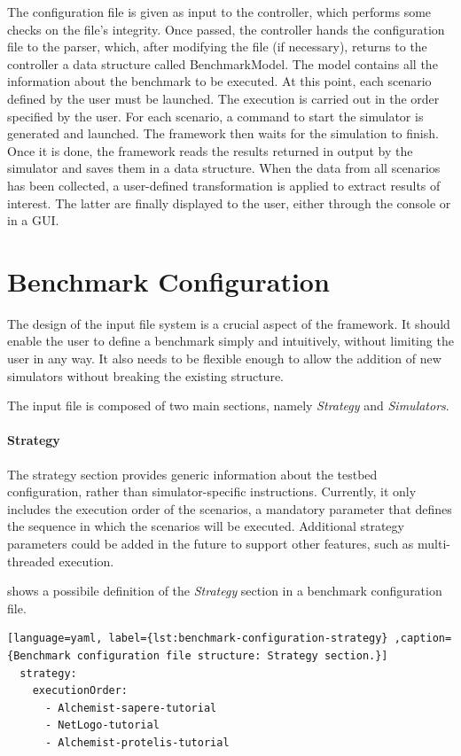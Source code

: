 \documentclass[12pt,a4paper,openright,twoside]{book}
\begin{document}
The configuration file is given as input to the controller, which performs some checks on the file's integrity.
Once passed, the controller hands the configuration file to the parser, which, after modifying the file (if necessary), returns to the controller a data structure called BenchmarkModel.
The model contains all the information about the benchmark to be executed.
At this point, each scenario defined by the user must be launched.
The execution is carried out in the order specified by the user.
For each scenario, a command to start the simulator is generated and launched.
The framework then waits for the simulation to finish.
Once it is done, the framework reads the results returned in output by the simulator and saves them in a data structure.
When the data from all scenarios has been collected, a user-defined transformation is applied to extract results of interest.
The latter are finally displayed to the user, either through the console or in a GUI.

\section{Benchmark Configuration}

The design of the input file system is a crucial aspect of the framework.
It should enable the user to define a benchmark simply and intuitively, without limiting the user in any way.
It also needs to be flexible enough to allow the addition of new simulators without breaking the existing structure.

The input file is composed of two main sections, namely \emph{Strategy} and \emph{Simulators}.

\paragraph*{Strategy}
The strategy section provides generic information about the testbed configuration, rather than simulator-specific instructions.
Currently, it only includes the execution order of the scenarios, a mandatory parameter that defines the sequence in which the scenarios will be executed.
Additional strategy parameters could be added in the future to support other features, such as multi-threaded execution.

 shows a possibile definition of the \emph{Strategy} section in a benchmark configuration file.

\begin{lstlisting}[language=yaml, label={lst:benchmark-configuration-strategy} ,caption={Benchmark configuration file structure: Strategy section.}]
  strategy:
    executionOrder:
      - Alchemist-sapere-tutorial
      - NetLogo-tutorial
      - Alchemist-protelis-tutorial
\end{lstlisting}
\end{document}

